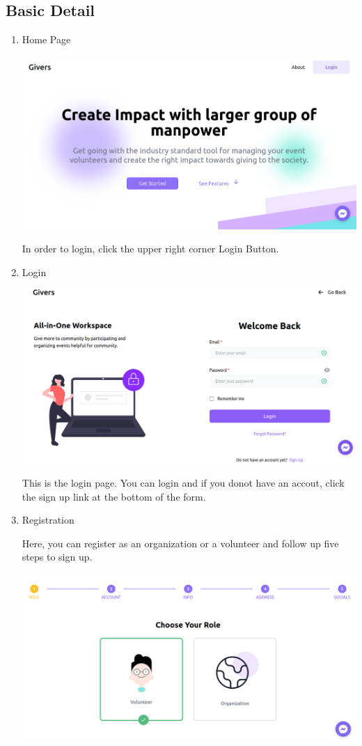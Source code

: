 \documentclass[12pt]{article}
\begin{document}
\subsection{Basic Detail}
\begin{enumerate}
	\item Home Page
	
		\includegraphics[scale = 0.35]{user/givers_home.png}

		In order to login, click the upper right corner Login Button.

	\item Login

		\includegraphics[scale = 0.35]{user/login_page.png}

		This is the login page. You can login and if you donot have an accout, click the sign up link at the bottom of the form.
\clearpage
	\item Registration

		Here, you can register as an organization or a volunteer and follow up five steps to sign up.

		\includegraphics[scale = 0.35]{user/user_register.png}

\end{enumerate}
\end{document}
